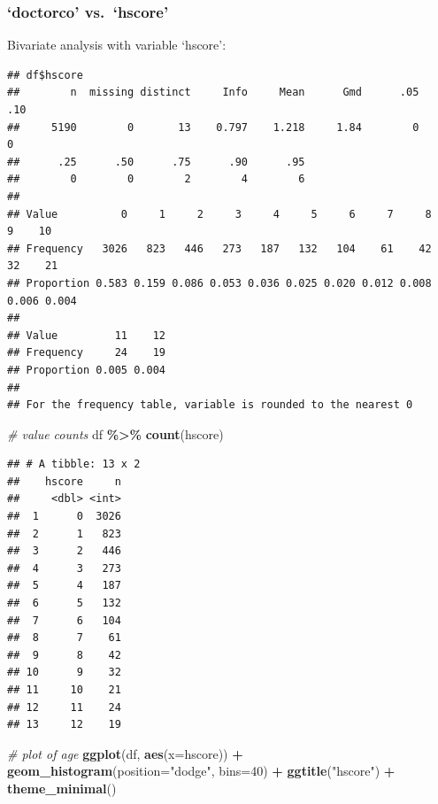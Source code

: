\documentclass[
]{article}
\newenvironment{Shaded}{\begin{snugshade}}{\end{snugshade}}
\newcommand{\AttributeTok}[1]{\textcolor[rgb]{0.13,0.29,0.53}{#1}}
\newcommand{\CommentTok}[1]{\textcolor[rgb]{0.56,0.35,0.01}{\textit{#1}}}
\newcommand{\DecValTok}[1]{\textcolor[rgb]{0.00,0.00,0.81}{#1}}
\newcommand{\FunctionTok}[1]{\textcolor[rgb]{0.13,0.29,0.53}{\textbf{#1}}}
\newcommand{\NormalTok}[1]{#1}
\newcommand{\SpecialCharTok}[1]{\textcolor[rgb]{0.81,0.36,0.00}{\textbf{#1}}}
\newcommand{\StringTok}[1]{\textcolor[rgb]{0.31,0.60,0.02}{#1}}
\begin{document}
\subsubsection{`doctorco' vs.~`hscore'}\label{doctorco-vs.-hscore}

Bivariate analysis with variable `hscore':

\begin{Shaded}
\end{Shaded}

\begin{verbatim}
## df$hscore 
##        n  missing distinct     Info     Mean      Gmd      .05      .10 
##     5190        0       13    0.797    1.218     1.84        0        0 
##      .25      .50      .75      .90      .95 
##        0        0        2        4        6 
##                                                                             
## Value          0     1     2     3     4     5     6     7     8     9    10
## Frequency   3026   823   446   273   187   132   104    61    42    32    21
## Proportion 0.583 0.159 0.086 0.053 0.036 0.025 0.020 0.012 0.008 0.006 0.004
##                       
## Value         11    12
## Frequency     24    19
## Proportion 0.005 0.004
## 
## For the frequency table, variable is rounded to the nearest 0
\end{verbatim}

\begin{Shaded}
\begin{Highlighting}[]
\CommentTok{\# value counts}
\NormalTok{df }\SpecialCharTok{\%\textgreater{}\%} \FunctionTok{count}\NormalTok{(hscore)}
\end{Highlighting}
\end{Shaded}

\begin{verbatim}
## # A tibble: 13 x 2
##    hscore     n
##     <dbl> <int>
##  1      0  3026
##  2      1   823
##  3      2   446
##  4      3   273
##  5      4   187
##  6      5   132
##  7      6   104
##  8      7    61
##  9      8    42
## 10      9    32
## 11     10    21
## 12     11    24
## 13     12    19
\end{verbatim}

\begin{Shaded}
\begin{Highlighting}[]
\CommentTok{\# plot of age}
\FunctionTok{ggplot}\NormalTok{(df, }\FunctionTok{aes}\NormalTok{(}\AttributeTok{x=}\NormalTok{hscore)) }\SpecialCharTok{+}
  \FunctionTok{geom\_histogram}\NormalTok{(}\AttributeTok{position=}\StringTok{"dodge"}\NormalTok{, }\AttributeTok{bins=}\DecValTok{40}\NormalTok{) }\SpecialCharTok{+}
  \FunctionTok{ggtitle}\NormalTok{(}\StringTok{"hscore"}\NormalTok{) }\SpecialCharTok{+}
  \FunctionTok{theme\_minimal}\NormalTok{()}
\end{Highlighting}
\end{Shaded}
\end{document}
